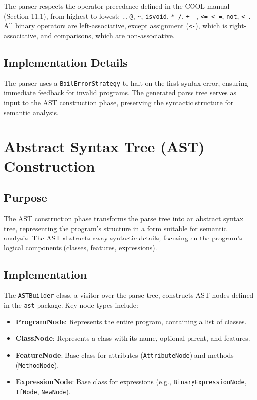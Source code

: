 \documentclass[titlepage]{article}
\begin{document}
The parser respects the operator precedence defined in the COOL manual (Section 11.1), from highest to lowest: \texttt{.}, \texttt{@}, \texttt{\textasciitilde}, \texttt{isvoid}, \texttt{* /}, \texttt{+ -}, \texttt{<= < =}, \texttt{not}, \texttt{<-}. All binary operators are left-associative, except assignment (\texttt{<-}), which is right-associative, and comparisons, which are non-associative.

\subsection{Implementation Details}

The parser uses a \texttt{BailErrorStrategy} to halt on the first syntax error, ensuring immediate feedback for invalid programs. The generated parse tree serves as input to the AST construction phase, preserving the syntactic structure for semantic analysis.

\section{Abstract Syntax Tree (AST) Construction}

\subsection{Purpose}

The AST construction phase transforms the parse tree into an abstract syntax tree, representing the program's structure in a form suitable for semantic analysis. The AST abstracts away syntactic details, focusing on the program's logical components (classes, features, expressions).

\subsection{Implementation}

The \texttt{ASTBuilder} class, a visitor over the parse tree, constructs AST nodes defined in the \texttt{ast} package. Key node types include:

\begin{itemize}
    \item \textbf{ProgramNode}: Represents the entire program, containing a list of classes.
    \item \textbf{ClassNode}: Represents a class with its name, optional parent, and features.
    \item \textbf{FeatureNode}: Base class for attributes (\texttt{AttributeNode}) and methods (\texttt{MethodNode}).
    \item \textbf{ExpressionNode}: Base class for expressions (e.g., \texttt{BinaryExpressionNode}, \texttt{IfNode}, \texttt{NewNode}).
\end{itemize}
\end{document}

